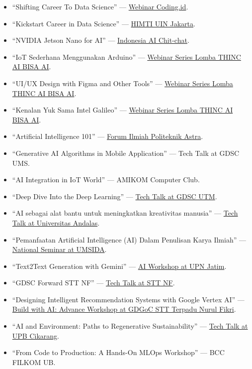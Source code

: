 \begin{itemize}
  \item ``Shifting Career To Data Science'' --- \href{https://coding.id/event/shifting-career-to-data-science-t8juk72h3d1n}{Webinar Coding.id}.
  \item ``Kickstart Career in Data Science'' --- \href{https://fst.uinjkt.ac.id/id/sharing-session-himti-kickstart-your-carrer-in-data-science}{HIMTI UIN Jakarta}.
  \item ``NVIDIA Jetson Nano for AI'' --- \href{https://www.youtube.com/watch?v=Ej4cG7-18vs}{Indonesia AI Chit-chat}.
  \item ``IoT Sederhana Menggunakan Arduino'' --- \href{https://www.tampil.id/event/detail/VFZSbk1VMVJQVDA9}{Webinar Series Lomba THINC AI BISA AI}.
  \item ``UI/UX Design with Figma and Other Tools'' --- \href{https://tampil.id/event/detail/VFZSbk1FNW5QVDA9}{Webinar Series Lomba THINC AI BISA AI}.
  \item ``Kenalan Yuk Sama Intel Galileo'' --- \href{https://tampil.id/event/detail/VFZSbk1FNTNQVDA9}{Webinar Series Lomba THINC AI BISA AI}.
  \item ``Artificial Intelligence 101'' --- \href{https://www.instagram.com/p/Cqw5g8jPR0q/}{Forum Ilmiah Politeknik Astra}.
  \item ``Generative AI Algorithms in Mobile Application'' --- Tech Talk at GDSC UMS.
  \item ``AI Integration in IoT World'' --- AMIKOM Computer Club.
  \item ``Deep Dive Into the Deep Learning'' --- \href{https://www.instagram.com/p/C4SmP7YLj6J}{Tech Talk at GDSC UTM}.
  \item ``AI sebagai alat bantu untuk meningkatkan kreativitas manusia'' --- \href{https://www.instagram.com/p/C65qgQ2xtG9}{Tech Talk at Universitas Andalas}.
  \item ``Pemanfaatan Artificial Intelligence (AI) Dalam Penulisan Karya Ilmiah'' --- \href{https://fai.umsida.ac.id/seminar-nasional-pemanfaatan-ai-untuk-penulisan-artikel-ilmiah-diikuti-oleh-900-mahasiswa-fai/}{National Seminar at UMSIDA}.
  \item ``Text2Text Generation with Gemini'' --- \href{https://www.instagram.com/p/C7eJxvcpQo_/}{AI Workshop at UPN Jatim}.
  \item ``GDSC Forward STT NF'' --- \href{https://www.instagram.com/p/C8XBQAhSKmr/}{Tech Talk at STT NF}.
  \item ``Designing Intelligent Recommendation Systems with Google Vertex AI'' --- \href{https://s.id/GDGOCNF_BWAI2025}{Build with AI: Advance Workshop at GDGoC STT Terpadu Nurul Fikri}.
  \item ``AI and Environment: Paths to Regenerative Sustainability'' --- \href{https://www.kompasiana.com/suryosudarmo6693/66dd476c34777c0601073c12/universitas-pelita-bangsa-melaunching-2-jurnal-program-study-teknik-informatika-dan-teknik-lingkungan}{Tech Talk at UPB Cikarang}.
  \item ``From Code to Production: A Hands-On MLOps Workshop'' --- BCC FILKOM UB.
\end{itemize}
